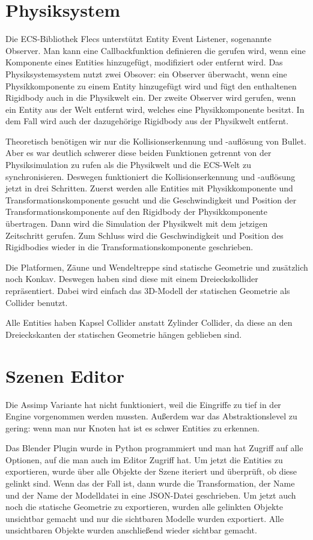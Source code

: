 \section{Physiksystem}

Die ECS-Bibliothek Flecs unterstützt Entity Event Listener, sogenannte Observer. Man kann eine Callbackfunktion definieren die gerufen wird, wenn eine Komponente eines Entities hinzugefügt, modifiziert oder entfernt wird. Das Physiksystemsystem nutzt zwei Obsover: ein Observer überwacht, wenn eine Physikkomponente zu einem Entity hinzugefügt wird und fügt den enthaltenen Rigidbody auch in die Physikwelt ein. Der zweite Observer wird gerufen, wenn ein Entity aus der Welt entfernt wird, welches eine Physikkomponente besitzt. In dem Fall wird auch der dazugehörige Rigidbody aus der Physikwelt entfernt.

Theoretisch benötigen wir nur die Kollisionserkennung und -auflösung von Bullet. Aber es war deutlich schwerer diese beiden Funktionen getrennt von der Physiksimulation zu rufen als die Physikwelt und die ECS-Welt zu synchronisieren. Deswegen funktioniert die Kollisionserkennung und -auflösung jetzt in drei Schritten. Zuerst werden alle Entities mit Physikkomponente und Transformationskomponente gesucht und die Geschwindigkeit und Position der Transformationskomponente auf den Rigidbody der Physikkomponente übertragen. Dann wird die Simulation der Physikwelt mit dem jetzigen Zeitschritt gerufen. Zum Schluss wird die Geschwindigkeit und Position des Rigidbodies wieder in die Transformationskomponente geschrieben.

Die Platformen, Zäune und Wendeltreppe sind statische Geometrie und zusätzlich noch Konkav. Deswegen haben sind diese mit einem Dreieckskollider repräsentiert. Dabei wird einfach das 3D-Modell der statischen Geometrie als Collider benutzt.

Alle Entities haben Kapsel Collider anstatt Zylinder Collider, da diese an den Dreieckskanten der statischen Geometrie hängen geblieben sind.

\section{Szenen Editor}

Die Assimp Variante hat nicht funktioniert, weil die Eingriffe zu tief in der Engine vorgenommen werden mussten. Außerdem war das Abstraktionslevel zu gering: wenn man nur Knoten hat ist es schwer Entities zu erkennen.

Das Blender Plugin wurde in Python programmiert und man hat Zugriff auf alle Optionen, auf die man auch im Editor Zugriff hat. Um jetzt die Entities zu exportieren, wurde über alle Objekte der Szene iteriert und überprüft, ob diese gelinkt sind. Wenn das der Fall ist, dann wurde die Transformation, der Name und der Name der Modelldatei in eine JSON-Datei geschrieben. Um jetzt auch noch die statische Geometrie zu exportieren, wurden alle gelinkten Objekte unsichtbar gemacht und nur die sichtbaren Modelle wurden exportiert. Alle unsichtbaren Objekte wurden anschließend wieder sichtbar gemacht.

